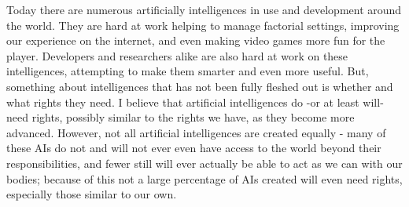 Today there are numerous artificially intelligences in use and development around the world. They are hard at work helping to manage factorial settings, improving our experience on the internet, and even making video games more fun for the player. Developers and researchers alike are also hard at work on these intelligences, attempting to make them smarter and even more useful. But, something about intelligences that has not been fully fleshed out is whether and what rights they need. I believe that artificial intelligences do -or at least will- need rights, possibly similar to the rights we have, as they become more advanced. However, not all artificial intelligences are created equally - many of these AIs do not and will not ever even have access to the world beyond their responsibilities, and fewer still will ever actually be able to act as we can with our bodies; because of this not a large percentage of AIs created will even need rights, especially those similar to our own.